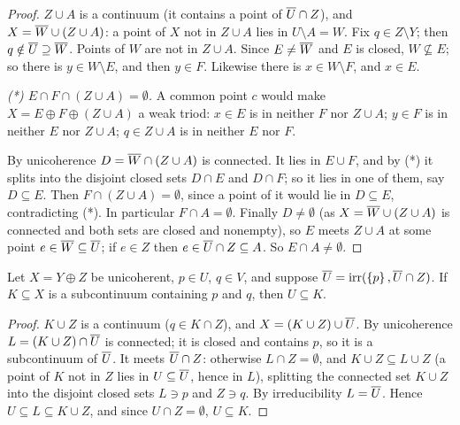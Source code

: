 \begin{proof}
$Z\cup A$ is a continuum (it contains a point of $\overline{U}\cap Z$), and $X=\overline{W}\cup(Z\cup A)$: a point of
$X$ not in $Z\cup A$ lies in $U\setminus A=W$. Fix $q\in Z\setminus Y$; then $q\notin\overline{U}\supseteq\overline{W}$.
Points of $W$ are not in $Z\cup A$. Since $E\neq\overline{W}$ and $E$ is closed, $W\not\subseteq E$; so there is
$y\in W\setminus E$, and then $y\in F$. Likewise there is $x\in W\setminus F$, and $x\in E$.

\emph{(*) $E\cap F\cap(Z\cup A)=\emptyset$.} A common point $c$ would make $X=E\oplus F\oplus(Z\cup A)$
a weak triod: $x\in E$ is in neither $F$ nor $Z\cup A$; $y\in F$ is in neither $E$ nor $Z\cup A$;
$q\in Z\cup A$ is in neither $E$ nor $F$.

By unicoherence $D=\overline{W}\cap(Z\cup A)$ is connected. It lies in $E\cup F$, and by (*) it splits into
the disjoint closed sets $D\cap E$ and $D\cap F$; so it lies in one of them, say $D\subseteq E$. Then
$F\cap(Z\cup A)=\emptyset$, since a point of it would lie in $D\subseteq E$, contradicting (*). In
particular $F\cap A=\emptyset$. Finally $D\ne\emptyset$ (as $X=\overline{W}\cup(Z\cup A)$ is connected and both
sets are closed and nonempty), so $E$ meets $Z\cup A$ at some point $e\in\overline{W}\subseteq\overline{U}$; if $e\in Z$
then $e\in\overline{U}\cap Z\subseteq A$. So $E\cap A\ne\emptyset$.
\end{proof}


\begin{lemma}\label{lem:1133a}
Let $X=Y\oplus Z$ be unicoherent, $p\in U$, $q\in V$, and suppose $\overline{U}=\operatorname{irr}(\left\{ p \right\},\overline{U}\cap Z)$. If
$K\subseteq X$ is a subcontinuum containing $p$ and $q$, then $U\subseteq K$.
\end{lemma}

\begin{proof}
$K\cup Z$ is a continuum ($q\in K\cap Z$), and $X=(K\cup Z)\cup\overline{U}$. By unicoherence
$L=(K\cup Z)\cap\overline{U}$ is connected; it is closed and contains $p$, so it is a subcontinuum of $\overline{U}$.
It meets $\overline{U}\cap Z$: otherwise $L\cap Z=\emptyset$, and $K\cup Z\subseteq L\cup Z$ (a point of $K$ not in
$Z$ lies in $U\subseteq\overline{U}$, hence in $L$), splitting the connected set $K\cup Z$ into the disjoint
closed sets $L\ni p$ and $Z\ni q$. By irreducibility $L=\overline{U}$. Hence $U\subseteq L\subseteq K\cup Z$, and since
$U\cap Z=\emptyset$, $U\subseteq K$.
\end{proof}

